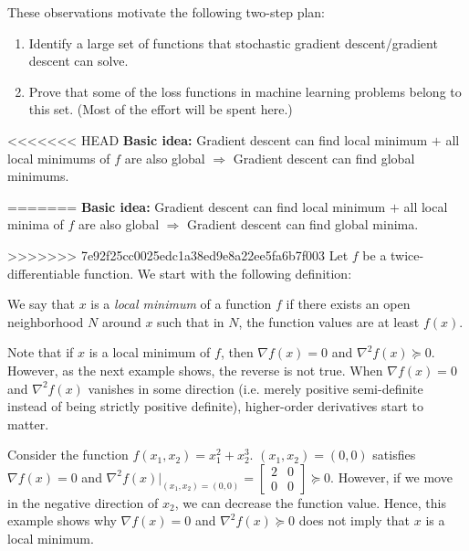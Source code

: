 These observations motivate the following two-step plan:

\begin{enumerate}
    \item Identify a large set of functions that stochastic gradient descent/gradient descent can solve.
    \item Prove that some of the loss functions in machine learning problems belong to this set. (Most of the effort will be spent here.)
\end{enumerate}
<<<<<<< HEAD
\textbf{Basic idea:} Gradient descent can find local minimum $+$ all local minimums of $f$ are also global $\Rightarrow$ Gradient descent can find global minimums.

=======
\textbf{Basic idea:} Gradient descent can find local minimum $+$ all local minima of $f$ are also global $\Rightarrow$ Gradient descent can find global minima.

>>>>>>> 7e92f25cc0025edc1a38ed9e8a22ee5fa6b7f003
Let $f$ be a twice-differentiable function. We start with the following definition:
\begin{definition} 
We say that $x$ is a \textit{local minimum} of a function $f$ if there exists an open neighborhood $N$ around $x$ such that in $N$, the function values are at least $f(x)$.
\end{definition}

Note that if $x$ is a local minimum of $f$, then $\nabla f(x) = 0$ and $\nabla^2 f(x) \succeq 0$. However, as the next example shows, the reverse is not true. When $\nabla f(x) = 0$ and $\nabla^2 f(x)$ vanishes in some direction (i.e. merely positive semi-definite instead of being strictly positive definite), higher-order derivatives start to matter.

\begin{example}
\label{lec10:ex:counterexample}
Consider the function $f(x_1, x_2) = x_1^2 + x_2^3$. $(x_1, x_2) = (0, 0)$ satisfies $\nabla f(x) = 0$ and $\nabla^2 f(x)|_{(x_1, x_2) = (0, 0)} = \begin{bmatrix} 2 & 0 \\
0 & 0\end{bmatrix} \succeq 0$. However, if we move in the negative direction of $x_2$, we can decrease the function value. Hence, this example shows why $\nabla f(x) = 0$ and $\nabla^2 f(x) \succeq 0$ does not imply that $x$ is a local minimum.
\end{example}


